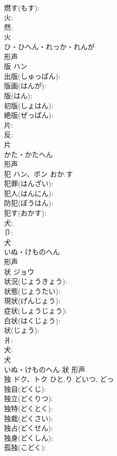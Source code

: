 \documentclass[8pt]{extreport}
\begin{document}
\begin{CJK}{UTF8}{min}
\\	燃す(もす): 
\\	火: 
\\	然: 
\\	火	
\\	ひ・ひへん・れっか・れんが	
\\	形声 
\\	版	ハン			
\\	出版(しゅっぱん): 
\\	版画(はんが): 
\\	版(はん): 
\\	初版(しょはん): 
\\	絶版(ぜっぱん): 
\\	片: 
\\	反: 
\\	片	
\\	かた・かたへん	
\\	形声 
\\	犯	ハン、ボン	おか.す		
\\	犯罪(はんざい): 
\\	犯人(はんにん): 
\\	防犯(ぼうはん): 
\\	犯す(おかす): 
\\	犬: 
\\	卩: 
\\	犬	
\\	いぬ・けものへん	
\\	形声 
\\	状	ジョウ			
\\	状況(じょうきょう): 
\\	状態(じょうたい): 
\\	現状(げんじょう): 
\\	症状(しょうじょう): 
\\	白状(はくじょう): 
\\	状(じょう): 
\\	爿: 
\\	犬: 
\\	犬	
\\	いぬ・けものへん	狀	形声 
\\	独	ドク、トク	ひと.り	どいつ, どっ	
\\	独自(どくじ): 
\\	独立(どくりつ): 
\\	独特(どくとく): 
\\	独裁(どくさい): 
\\	独占(どくせん): 
\\	独身(どくしん): 
\\	孤独(こどく): 

\end{CJK}
\end{document}
